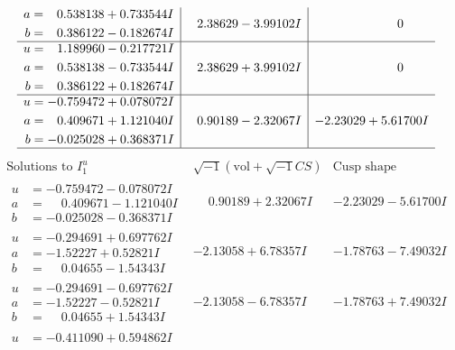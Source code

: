 \documentclass[1p]{elsarticle_modified}
\theoremstyle{definition}
\newcommand{\I}{\sqrt{-1}}
\begin{document}
$$\begin{array}{c|c|c}
\begin{aligned}
a &= \phantom{-}0.538138 + 0.733544 I \\
b &= \phantom{-}0.386122 - 0.182674 I\end{aligned}
 & \phantom{-}2.38629 - 3.99102 I & \phantom{-0.000000 } 0 \\ \hline\begin{aligned}
u &= \phantom{-}1.189960 - 0.217721 I \\
a &= \phantom{-}0.538138 - 0.733544 I \\
b &= \phantom{-}0.386122 + 0.182674 I\end{aligned}
 & \phantom{-}2.38629 + 3.99102 I & \phantom{-0.000000 } 0 \\ \hline\begin{aligned}
u &= -0.759472 + 0.078072 I \\
a &= \phantom{-}0.409671 + 1.121040 I \\
b &= -0.025028 + 0.368371 I\end{aligned}
 & \phantom{-}0.90189 - 2.32067 I & -2.23029 + 5.61700 I\\
 \hline 
 \end{array}$$\newpage$$\begin{array}{c|c|c}  
\text{Solutions to }I^u_{1}& \I (\text{vol} + \sqrt{-1}CS) & \text{Cusp shape}\\
 \hline 
\begin{aligned}
u &= -0.759472 - 0.078072 I \\
a &= \phantom{-}0.409671 - 1.121040 I \\
b &= -0.025028 - 0.368371 I\end{aligned}
 & \phantom{-}0.90189 + 2.32067 I & -2.23029 - 5.61700 I \\ \hline\begin{aligned}
u &= -0.294691 + 0.697762 I \\
a &= -1.52227 + 0.52821 I \\
b &= \phantom{-}0.04655 - 1.54343 I\end{aligned}
 & -2.13058 + 6.78357 I & -1.78763 - 7.49032 I \\ \hline\begin{aligned}
u &= -0.294691 - 0.697762 I \\
a &= -1.52227 - 0.52821 I \\
b &= \phantom{-}0.04655 + 1.54343 I\end{aligned}
 & -2.13058 - 6.78357 I & -1.78763 + 7.49032 I \\ \hline\begin{aligned}
u &= -0.411090 + 0.594862 I \\

\end{aligned}
\end{array}$$
\end{document}
